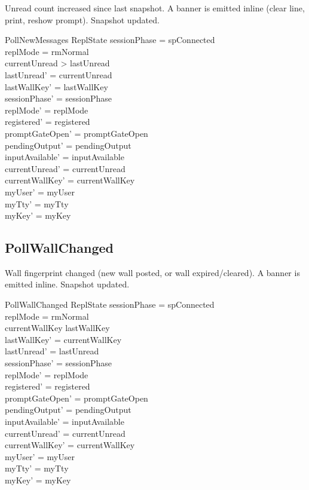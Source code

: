 \documentclass[a4paper,10pt,fleqn]{article}
\begin{document}
Unread count increased since last snapshot.  A banner is emitted
inline (clear line, print, reshow prompt).  Snapshot updated.

\begin{schema}{PollNewMessages}
  \Delta ReplState
\where
  sessionPhase = spConnected \\
  replMode = rmNormal \\
  currentUnread > lastUnread \\
  lastUnread' = currentUnread \\
  lastWallKey' = lastWallKey \\
  sessionPhase' = sessionPhase \\
  replMode' = replMode \\
  registered' = registered \\
  promptGateOpen' = promptGateOpen \\
  pendingOutput' = pendingOutput \\
  inputAvailable' = inputAvailable \\
  currentUnread' = currentUnread \\
  currentWallKey' = currentWallKey \\
  myUser' = myUser \\
  myTty' = myTty \\
  myKey' = myKey
\end{schema}

\subsection{PollWallChanged}

Wall fingerprint changed (new wall posted, or wall expired/cleared).
A banner is emitted inline.  Snapshot updated.

\begin{schema}{PollWallChanged}
  \Delta ReplState
\where
  sessionPhase = spConnected \\
  replMode = rmNormal \\
  currentWallKey \neq lastWallKey \\
  lastWallKey' = currentWallKey \\
  lastUnread' = lastUnread \\
  sessionPhase' = sessionPhase \\
  replMode' = replMode \\
  registered' = registered \\
  promptGateOpen' = promptGateOpen \\
  pendingOutput' = pendingOutput \\
  inputAvailable' = inputAvailable \\
  currentUnread' = currentUnread \\
  currentWallKey' = currentWallKey \\
  myUser' = myUser \\
  myTty' = myTty \\
  myKey' = myKey
\end{schema}
\end{document}
